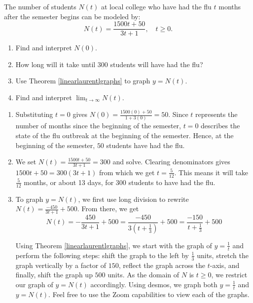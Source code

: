 \documentclass{ximera}
\begin{document}
\begin{example}  \label{fluex} The number of students $N(t)$ at local college who have had the flu $t$ months after the semester begins can be modeled by: \[ N(t) = \frac{1500t + 50}{3t+1},  \quad t \geq 0.\]

\begin{enumerate}

\item  Find and interpret $N(0)$.

\item  How long will it take until $300$ students will have had the flu?

\item  Use Theorem \ref{linearlaurentlgraphs} to graph $y = N(t)$.  

\item  Find and interpret $\lim_{t \rightarrow \infty} N(t)$.

\end{enumerate}

\begin{explanation}

\begin{enumerate}

\item  Substituting $t=0$ gives $N(0) = \frac{1500(0) + 50}{1+3(0)} = 50$.  Since $t$ represents the number of months since the beginning of the semester, $t=0$ describes the state of the flu outbreak at the beginning of the semester. Hence,  at the beginning of the semester, $50$ students have had the flu.

\item  We set $N(t) = \frac{1500t + 50}{3t+1}  = 300$ and solve.  Clearing denominators gives $1500t + 50 = 300(3t+1)$ from which we get $t = \frac{5}{12}$.  This means it will take $\frac{5}{12}$ months, or about 13 days, for $300$ students to have had the flu.

\item To graph $y = N(t)$, we first use long division to rewrite $N(t) = \frac{-450}{3t+1} + 500$.  From there, we get  \[N(t) =  -\frac{450}{3t+1} + 500  = \frac{-450}{3\left(t + \frac{1}{3}\right)} + 500 = \frac{-150}{t+\frac{1}{3}} + 500\]

Using Theorem \ref{linearlaurentlgraphs}, we start with the graph of $y = \frac{1}{t}$ and perform the following steps: shift the graph to the left by $\frac{1}{3}$ units, stretch the graph vertically by a factor of $150$, reflect the graph across the $t$-axis, and finally, shift the graph up $500$ units.   As the domain of $N$ is $t \geq 0$, we restrict our graph of $y = N(t)$ accordingly.  Using desmos, we graph both $y = \frac{1}{t}$ and $y = N(t)$.  Feel free to use the Zoom capabilities to view each of the graphs.


\end{enumerate}
\end{explanation}
\end{example}
\end{document}

